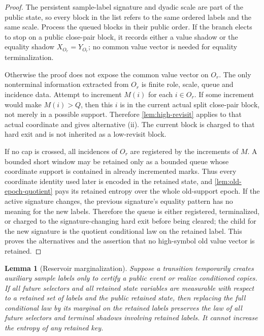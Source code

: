 \documentclass[11pt]{article}
\newcommand{\Cref}[1]{\ref{#1}}
\newtheorem{lemma}[theorem]{Lemma}
\theoremstyle{remark}
\begin{document}
\begin{proof}
The persistent sample-label signature and dyadic scale are part of the public state, so every block in the list refers to the same ordered labels and the same scale.  Process the queued blocks in their public order.  If the branch elects to stop on a public close-pair block, it records either a value shadow or the equality shadow $X_{O_r}=Y_{O_r}$; no common value vector is needed for equality terminalization.

Otherwise the proof does not expose the common value vector on $O_r$.  The only nonterminal information extracted from $O_r$ is finite role, scale, queue and incidence data.  Attempt to increment $M(i)$ for each $i\in O_r$.  If some increment would make $M(i)>Q$, then this $i$ is in the current actual split close-pair block, not merely in a possible support.  Therefore \Cref{lem:high-revisit} applies to that actual coordinate and gives alternative (ii).  The current block is charged to that hard exit and is not inherited as a low-revisit block.

If no cap is crossed, all incidences of $O_r$ are registered by the increments of $M$.  A bounded short window may be retained only as a bounded queue whose coordinate support is contained in already incremented marks.  Thus every coordinate identity used later is encoded in the retained state, and \Cref{lem:old-epoch-quotient} pays its retained entropy over the whole old-support epoch.  If the active signature changes, the previous signature's equality pattern has no meaning for the new labels.  Therefore the queue is either registered, terminalized, or charged to the signature-changing hard exit before being cleared; the child for the new signature is the quotient conditional law on the retained label.  This proves the alternatives and the assertion that no high-symbol old value vector is retained.
\end{proof}


\begin{lemma}[Reservoir marginalization]\label{lem:reservoir-marg}
Suppose a transition temporarily creates auxiliary sample labels only to certify a public event or realize conditioned copies.  If all future selectors and all retained state variables are measurable with respect to a retained set of labels and the public retained state, then replacing the full conditional law by its marginal on the retained labels preserves the law of all future selectors and terminal shadows involving retained labels.  It cannot increase the entropy of any retained key.
\end{lemma}
\end{document}
